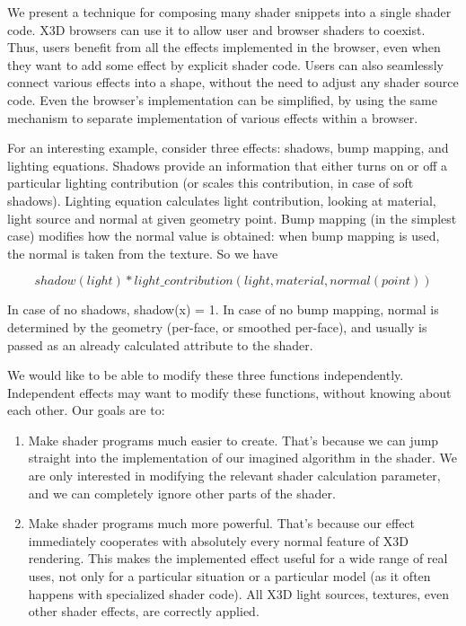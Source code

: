 \documentclass{acmsiggraph}                     %
\begin{document}
We present a technique for composing many shader snippets into a
single shader code. X3D browsers can use it to allow user and browser
shaders to coexist. Thus, users benefit from all the effects
implemented in the browser, even when they want to add some effect by
explicit shader code. Users can also seamlessly connect various
effects into a shape, without the need to adjust any shader source
code. Even the browser's implementation can be simplified, by using
the same mechanism to separate implementation of various effects
within a browser.

For an interesting example, consider three effects: shadows, bump
mapping, and lighting equations. Shadows provide an information that
either turns on or off a particular lighting contribution (or scales
this contribution, in case of soft shadows). Lighting equation
calculates light contribution, looking at material, light source and
normal at given geometry point. Bump mapping
\cite{vrmleng:bumpmapping} (in the simplest case)
modifies how the normal value is obtained: when bump mapping is used,
the normal is taken from the texture. So we have

$$ shadow(light) * light\_contribution(light, material, normal(point)) $$

In case of no shadows, shadow(x) = 1. In case of no bump mapping,
normal is determined by the geometry (per-face, or smoothed per-face),
and usually is passed as an already calculated attribute to the
shader.

We would like to be able to modify these three functions independently.
Independent effects may want to modify these functions, without knowing
about each other. Our goals are to:

\begin{enumerate}
\item Make shader programs much easier to create. That's because we
  can jump straight into the implementation of our imagined algorithm
  in the shader.
  We are only interested in modifying the relevant shader calculation
  parameter, and we can completely ignore other parts of the shader.

\item Make shader programs much more powerful. That's because our effect
  immediately cooperates with absolutely every normal feature of X3D rendering.
  This makes the implemented effect useful for a wide range of real uses,
  not only for a particular situation or a particular model (as it often happens
  with specialized shader code).
  All X3D light sources, textures, even other shader effects,
  are correctly applied.
\end{enumerate}
\end{document}
